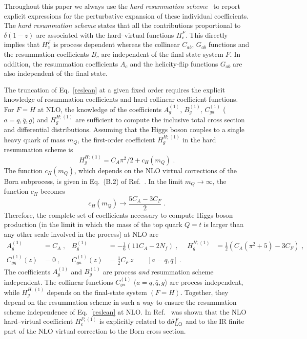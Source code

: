 \documentclass[12pt]{article}
\DeclareRobustCommand{\nn}{\nonumber}
\DeclareRobustCommand{\rd}{\ensuremath{\mathrm{d}}}
\begin{document}
\begin{appendix}
Throughout this paper we always use the \textit{hard resummation scheme}~\cite{Catani:2013tia} to report explicit expressions for the perturbative expansion of these individual coefficients. The \textit{hard resummation scheme} states that all the contributions proportional to $\delta(1-z)$ are associated with the hard--virtual functions $H_c^{F}$. This directly implies that $H_c^{F}$ is process dependent whereas the collinear $C_{ab}$, $G_{ab}$ functions and the resummation coefficients $B_{c}$ are independent of the final state system $F$. In addition, the resummation coefficients $A_{c}$ and the helicity-flip functions $G_{ab}$ are also independent of the final state.

The truncation of Eq.~\eqref{reslean} at a given fixed order requires the explicit knowledge of resummation coefficients and hard collinear coefficient functions.
For $F=H$ at NLO, the knowledge of the coefficients $A^{(1)}_{g}$, $B^{(1)}_{g}$, $C^{(1)}_{ga}$ ($a=q,{\bar q},g$) and $H^{H;(1)}_{g}$ are sufficient to compute the inclusive total cross section and differential distributions. Assuming that the Higgs boson couples to a single heavy quark of mass $m_Q$, the first-order coefficient $H_g^{H;(1)}$ in the hard resummation scheme is~\cite{Catani:2013tia}
\begin{equation}
  H_g^{H;(1)} = C_A\pi^2/2+c_H(m_Q) \;.
  \label{H1g}
\end{equation}
The function $c_H(m_Q)$, which depends on the NLO virtual corrections of the Born subprocess, is given in Eq.~(B.2) of Ref.~\cite{Spira:1995rr}. In the limit $m_Q\to \infty$, the function $c_H$ becomes
\begin{equation}
  c_H(m_Q)\longrightarrow\frac{5C_A-3C_F}{2} \;.
\end{equation}
Therefore, the complete set of coefficients necessary to compute Higgs boson production (in the limit in which the mass of the top quark $Q=t$ is larger than any other scale involved in the process) at NLO are
\begin{align}
  A^{(1)}_{g} &= C_{A}\;, &
  B^{(1)}_{g} &= -\frac{1}{6} \left( 11 C_A - 2 N_f \right)\;, &
  H^{H;(1)}_{g} &= \frac{1}{2}(C_{A}(\pi^{2}+5)-3 C_{F})\;,
  \nn\\
  C^{(1)}_{gg}(z) &= 0 \;, &
  C^{(1)}_{ga}(z) &= \frac{1}{2}C_F\,z \qquad\left[a=q,{\bar q}\right] \;.
  \label{eq:nloconstants}
\end{align}
The coefficients $A^{(1)}_{g}$ and $B^{(1)}_{g}$ are process \emph{and} resummation scheme independent. The collinear functions $C^{(1)}_{ga}$ ($a=q,{\bar q},g$) are process independent, while $H^{H;(1)}_{g}$ depends on the final-state system $(F=H)$. Together,  they depend on the resummation scheme in such a way to ensure the resummation scheme independence of Eq.~\eqref{reslean} at NLO. In Ref.~\cite{deFlorian:2001zd} was shown that the NLO hard--virtual coefficient $H^{F;(1)}_{c}$ is explicitly related to $\rd\hat{\sigma}^{F}_{\rm LO}$ and to the IR finite part of the NLO virtual correction to the Born cross section. 


\end{appendix}
\end{document}
